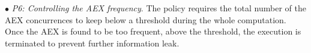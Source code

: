 




\vspace{2pt}\noindent$\bullet$\textit{ P6: Controlling the AEX frequency}. The policy requires the total number of the AEX concurrences to keep below a threshold during the whole computation. Once the AEX is found to be too frequent, above the threshold, the execution is terminated to prevent further information leak.





